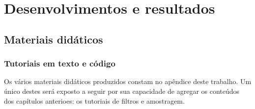 \chapter{Desenvolvimentos e resultados} %
\label{cap:resultados} %

\section{Materiais didáticos}

\subsection{Tutoriais em texto e código}

Os vários materiais didáticos produzidos constam no apêndice
deste trabalho. Um único destes será exposto a seguir por sua
capacidade de agregar os conteúdos dos capítulos anterioes:
os tutoriais de filtros e amostragem.


